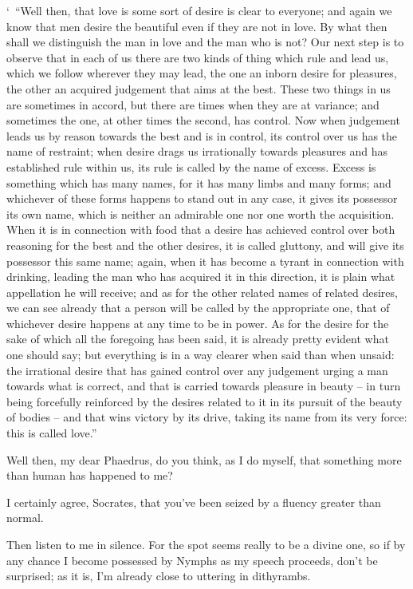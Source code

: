 ‘~“Well then, that love is some sort of
desire is clear to
everyone; and again we know that men desire the
beautiful  even
if they are not in love. By what then shall we distinguish the man in
love and the man who is not? Our next step is to observe that in each of
us there are two kinds of thing which rule and lead us, which we follow
wherever they may lead, the one an inborn desire for pleasures, the
other an acquired judgement that aims at the best. These two things in
us are sometimes in accord, but there are times when they are at
 variance; and sometimes the one, at other times the second, has
control. Now when judgement leads us by reason towards the best and is
in control, its control over us has the name of 
restraint; when desire
drags us irrationally towards pleasures and has established rule within
us, its rule is called by the name of
excess. Excess is
something which has many names, for it has many limbs and many forms;
and whichever of these forms  happens to stand out in any case,
it gives its possessor its own name, which is neither an admirable one
nor one worth the acquisition. When it is in connection with food that a
desire has achieved control over both reasoning for the best and the
 other desires, it is called gluttony, and will give its
possessor this same name; again, when it has become a tyrant in
connection with drinking, leading the man who has acquired it in this
direction, it is plain what appellation he will receive; and as
for the other related names of related desires, we can see
already that a person will be called by the appropriate one, that of
whichever desire happens at any time to be in power. As for the desire
for the sake of which all the foregoing has been said, it is already
pretty evident what one should say; but everything is in a way clearer
when said than when unsaid: the irrational desire that has gained
control over any judgement urging a man  towards what is
correct, and that is carried towards pleasure in beauty -- in turn being
forcefully reinforced by the desires related to it in its pursuit of the
beauty of bodies -- and that wins victory by its drive, taking its name
from its very force: this is called
love.”

 Well then, my dear Phaedrus, do you think, as I do myself, that
something more than
human has happened to
me?

I certainly agree, Socrates, that you've been seized by a
fluency greater than normal.

Then listen to me in silence. For the spot seems 
really to be a divine one, so if by any chance I become possessed by
Nymphs as my speech proceeds, don't be surprised; as it is, I'm already
close to uttering in
dithyrambs.


